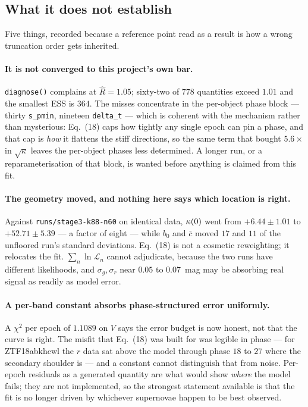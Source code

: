 \documentclass[11pt]{article}
\newcommand{\file}[1]{\texttt{#1}}
\newcommand{\code}[1]{\texttt{#1}}
\begin{document}
\subsection{What it does not establish}
\label{sec:run1gaps}

Five things, recorded because a reference point read as a result is how a wrong truncation
order gets inherited.

\paragraph{It is not converged to this project's own bar.} \code{diagnose()} complains at
$\hat R = 1.05$; sixty-two of $778$ quantities exceed $1.01$ and the smallest ESS is $364$.
The misses concentrate in the per-object phase block --- thirty \code{s\_pmin}, nineteen
\code{delta\_t} --- which is coherent with the mechanism rather than mysterious:
Eq.~(18) caps how tightly any single epoch can pin a phase, and that cap is
\emph{how} it flattens the stiff directions, so the same term that bought
$5.6\times$ in $\sqrt{\kappa}$ leaves the per-object phases less determined. A longer run,
or a reparameterisation of that block, is wanted before anything is claimed from this fit.

\paragraph{The geometry moved, and nothing here says which location is right.} Against
\file{runs/stage3-k88-n60} on identical data, $\kappa(0)$ went from $+6.44 \pm 1.01$ to
$+52.71 \pm 5.39$ --- a factor of eight --- while $b_{0}$ and $\bar c$ moved $17$ and $11$
of the unfloored run's standard deviations. Eq.~(18) is not a cosmetic reweighting;
it relocates the fit. $\sum_{n}\ln\mathcal{L}_{n}$ cannot adjudicate, because the two runs
have different likelihoods, and $\sigma_{g}, \sigma_{r}$ near $0.05$ to $0.07$~mag may be
absorbing real signal as readily as model error.

\paragraph{A per-band constant absorbs phase-structured error uniformly.} A
$\chi^{2}$ per epoch of $1.1089$ on $V$ says the error budget is now honest, not that the
curve is right. The misfit that Eq.~(18) was built for was legible in phase --- for
ZTF18abkhcwl the $r$ data sat above the model through phase $18$ to $27$ where the
secondary shoulder is --- and a constant cannot distinguish that from noise. Per-epoch
residuals as a generated quantity are what would show \emph{where} the model fails; they
are not implemented, so the strongest statement available is that the fit is no longer
driven by whichever supernovae happen to be best observed.
\end{document}
